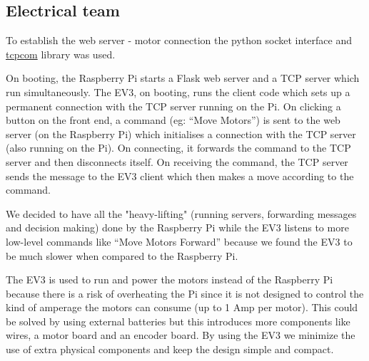 \documentclass{article}
\begin{document}
\subsection{Electrical team}

To establish the web server - motor connection the python socket interface and \href{https://github.com/imgeorgiev/tcpcom}{tcpcom} library was used.

On booting, the Raspberry Pi starts a Flask web server and a TCP server which run simultaneously. The EV3, on booting, runs the client code which sets up a permanent connection with the TCP server running on the Pi. On clicking a button on the front end, a command  (eg: “Move Motors”) is sent to the web server (on the Raspberry Pi) which initialises a connection with the TCP server (also running on the Pi). On connecting, it forwards the command to the TCP server and then disconnects itself. On receiving the command, the TCP server sends the message to the EV3 client which then makes a move according to the command.



We decided to have all the "heavy-lifting" (running servers, forwarding messages and decision making) done by the Raspberry Pi while the EV3 listens to more low-level commands like “Move Motors Forward” because we found the EV3 to be much slower when compared to the Raspberry Pi.


The EV3 is used to run and power the motors instead of the Raspberry Pi because there is a risk of overheating the Pi since it is not designed to control the kind of amperage the motors can consume (up to 1 Amp per motor). This could be solved by using external batteries but this introduces more components like wires, a motor board and an encoder board. By using the EV3 we minimize the use of extra physical components and keep the design simple and compact.
\end{document}
